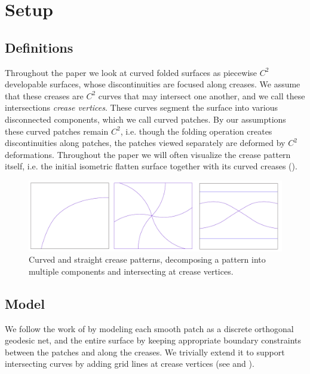 \section{Setup} \label{sec:pre}
\subsection{Definitions}
Throughout the paper we look at curved folded surfaces as piecewise $C^2$ developable surfaces, whose discontinuities are focused along creases. We assume that these creases are $C^2$ curves that may intersect one another, and we call these intersections \textit{crease vertices}. These curves segment the surface into various disconnected components, which we call curved patches. By our assumptions these curved patches remain $C^2$, i.e. though the folding operation creates discontinuities along patches, the patches viewed separately are deformed by $C^2$ deformations. Throughout the paper we will often visualize the crease pattern itself, i.e. the initial isometric flatten surface together with its curved creases ().
\begin{figure} [h]
	\centering
	\includegraphics[width=\linewidth]{figures/crease_patterns}
	\caption{Curved and straight crease patterns, decomposing a pattern into multiple components and intersecting at crease vertices.}
	\label{fig:crease_pattern}
\end{figure}

\subsection{Model}
We follow the work of \cite{rabi2018shape} by modeling each smooth patch as a discrete orthogonal geodesic net, and the entire surface by keeping appropriate boundary constraints between the patches and along the creases. We trivially extend it to support intersecting curves by adding grid lines at crease vertices (see  and ).

